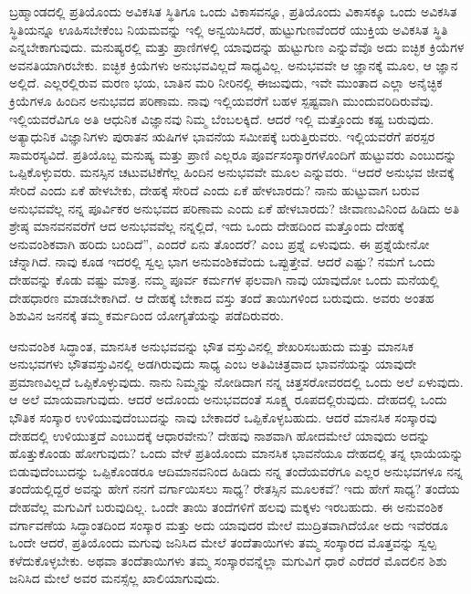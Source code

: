 ಬ್ರಹ್ಮಾಂಡದಲ್ಲಿ ಪ್ರತಿಯೊಂದು ಅವಿಕಸಿತ ಸ್ಥಿತಿಗೂ ಒಂದು ವಿಕಾಸವನ್ನೂ, ಪ್ರತಿಯೊಂದು ವಿಕಾಸಕ್ಕೂ ಒಂದು ಅವಿಕಸಿತ ಸ್ಥಿತಿಯನ್ನೂ ಊಹಿಸಬೇಕೆಂಬ ನಿಯಮವನ್ನು ಇಲ್ಲಿ ಅನ್ವಯಿಸಿದರೆ, ಹುಟ್ಟುಗುಣವೆಂದರೆ ಯುಕ್ತಿಯ ಅವಿಕಸಿತ ಸ್ಥಿತಿ ಎನ್ನಬೇಕಾಗುವುದು. ಮನುಷ್ಯರಲ್ಲಿ ಮತ್ತು ಪ್ರಾಣಿಗಳಲ್ಲಿ ಯಾವುದನ್ನು ಹುಟ್ಟುಗುಣ ಎನ್ನುವೆವೊ ಅದು ಐಚ್ಛಿಕ ಕ್ರಿಯೆಗಳ ಅವನತಿಯಾಗಿರಬೇಕು. ಐಚ್ಛಿಕ ಕ್ರಿಯೆಗಳು ಅನುಭವವಿಲ್ಲದೆ ಸಾಧ್ಯವಿಲ್ಲ. ಅನುಭವವೇ ಆ ಜ್ಞಾನಕ್ಕೆ ಮೂಲ, ಆ ಜ್ಞಾನ ಅಲ್ಲಿದೆ. ಎಲ್ಲರಲ್ಲಿರುವ ಮರಣ ಭಯ, ಬಾತಿನ ಮರಿ ನೀರಿನಲ್ಲಿ ಈಜುವುದು, ಇವೇ ಮುಂತಾದ ಎಲ್ಲಾ ಅನೈಚ್ಛಿಕ ಕ್ರಿಯೆಗಳೂ ಹಿಂದಿನ ಅನುಭವದ ಪರಿಣಾಮ. ನಾವು ಇಲ್ಲಿಯವರೆಗೆ ಬಹಳ ಸ್ಪಷ್ಟವಾಗಿ ಮುಂದುವರಿದಿರುವೆವು. ಇಲ್ಲಿಯವರೆವಿಗೂ ಅತಿ ಆಧುನಿಕ ವಿಜ್ಞಾನವು ನಿಮ್ಮ ಬೆಂಬಲಕ್ಕಿದೆ. ಆದರೆ ಇಲ್ಲಿ ಮತ್ತೊಂದು ಕಷ್ಟ ಬರುವುದು. ಅತ್ಯಾಧುನಿಕ ವಿಜ್ಞಾನಿಗಳು ಪುರಾತನ ಋಷಿಗಳ ಭಾವನೆಯ ಸಮೀಪಕ್ಕೆ ಬರುತ್ತಿರುವರು. ಇಲ್ಲಿಯವರೆಗೆ ಪರಸ್ಪರ ಸಾಮರಸ್ಯವಿದೆ. ಪ್ರತಿಯೊಬ್ಬ ಮನುಷ್ಯ ಮತ್ತು ಪ್ರಾಣಿ ಎಲ್ಲರೂ ಪೂರ್ವಸಂಸ್ಕಾರಗಳೊಂದಿಗೆ ಹುಟ್ಟುವರು ಎಂಬುದನ್ನು ಒಪ್ಪಿಕೊಳ್ಳುವರು. ಮನಸ್ಸಿನ ಚಟುವಟಿಕೆಗೆಲ್ಲ ಹಿಂದಿನ ಅನುಭವವೇ ಮೂಲ ಎನ್ನುವರು. “ಆದರೆ ಅನುಭವ ಜೀವಕ್ಕೆ ಸೇರಿದೆ ಎಂದು ಏಕೆ ಹೇಳಬೇಕು, ದೇಹಕ್ಕೆ ಸೇರಿದೆ ಎಂದು ಏಕೆ ಹೇಳಬಾರದು? ನಾನು ಹುಟ್ಟುವಾಗ ಬರುವ ಅನುಭವವೆಲ್ಲ ನನ್ನ ಪೂರ್ವಿಕರ ಅನುಭವದ ಪರಿಣಾಮ ಎಂದು ಏಕೆ ಹೇಳಬಾರದು? ಜೀವಾಣುವಿನಿಂದ ಹಿಡಿದು ಅತಿ ಶ್ರೇಷ್ಠ ಮಾನವನವರೆಗೆ ಆದ ಅನುಭವವೆಲ್ಲ ನನ್ನಲ್ಲಿದೆ, ಇದು ಒಂದು ದೇಹದಿಂದ ಮತ್ತೊಂದು ದೇಹಕ್ಕೆ ಅನುವಂಶಿಕವಾಗಿ ಹರಿದು ಬಂದಿದೆ”, ಎಂದರೆ ಏನು ತೊಂದರೆ? ಎಂಬ ಪ್ರಶ್ನೆ ಏಳುವುದು. ಈ ಪ್ರಶ್ನೆಯೇನೋ ಚೆನ್ನಾಗಿದೆ. ನಾವು ಕೂಡ ಇದರಲ್ಲಿ ಸ್ವಲ್ಪ ಭಾಗ ಅನುವಂಶಿಕವೆಂದು ಒಪ್ಪುತ್ತೇವೆ. ಆದರೆ ಎಷ್ಟು? ನಮಗೆ ಒಂದು ದೇಹವನ್ನು ಕೊಡು ವಷ್ಟು ಮಾತ್ರ. ನಮ್ಮ ಪೂರ್ವ ಕರ್ಮಗಳ ಫಲವಾಗಿ ನಾವು ಯಾವುದೋ ಒಂದು ಮನೆಯಲ್ಲಿ ದೇಹಧಾರಣ ಮಾಡಬೇಕಾಗಿದೆ. ಆ ದೇಹಕ್ಕೆ ಬೇಕಾದ ವಸ್ತು ತಂದೆ ತಾಯಿಗಳಿಂದ ಬರುವುದು. ಅವರು ಅಂತಹ ಶಿಶುವಿನ ಜನನಕ್ಕೆ ತಮ್ಮ ಕರ್ಮದಿಂದ ಯೋಗ್ಯತೆಯನ್ನು ಪಡೆದಿರುವರು.

ಆನುವಂಶಿಕ ಸಿದ್ಧಾಂತ, ಮಾನಸಿಕ ಅನುಭವವನ್ನು ಭೌತ ವಸ್ತುವಿನಲ್ಲಿ ಶೇಖರಿಸಬಹುದು ಮತ್ತು ಮಾನಸಿಕ ಅನುಭವಗಳು ಭೌತವಸ್ತುವಿನಲ್ಲಿ ಅಡಗಿರುವುದು ಸಾಧ್ಯ ಎಂಬ ಅತಿವಿಚಿತ್ರವಾದ ಭಾವನೆಯನ್ನು ಯಾವುದೇ ಪ್ರಮಾಣವಿಲ್ಲದೆ ಒಪ್ಪಿಕೊಳ್ಳುವುದು. ನಾನು ನಿಮ್ಮನ್ನು ನೋಡಿದಾಗ ನನ್ನ ಚಿತ್ತಸರೋವರದಲ್ಲಿ ಒಂದು ಅಲೆ ಏಳುವುದು. ಆ ಅಲೆ ಮಾಯವಾಗುವುದು. ಆದರೆ ಅದೊಂದು ಅನುಭವದಂತೆ ಸೂಕ್ಷ್ಮ ರೂಪದಲ್ಲಿರುವುದು. ದೇಹದಲ್ಲಿ ಒಂದು ಭೌತಿಕ ಸಂಸ್ಕಾರ ಉಳಿಯುವುದೆಂಬುದನ್ನು ನಾವು ಬೇಕಾದರೆ ಒಪ್ಪಿಕೊಳ್ಳಬಹುದು. ಆದರೆ ಮಾನಸಿಕ ಸಂಸ್ಕಾರವು ದೇಹದಲ್ಲಿ ಉಳಿಯುತ್ತದೆ ಎಂಬುದಕ್ಕೆ ಆಧಾರವೇನು? ದೇಹವು ನಾಶವಾಗಿ ಹೋದಮೇಲೆ ಯಾವುದು ಅದನ್ನು ಹೊತ್ತುಕೊಂಡು ಹೋಗುವುದು? ಒಂದು ವೇಳೆ ಪ್ರತಿಯೊಂದು ಮಾನಸಿಕ ಭಾವನೆಯೂ ದೇಹದಲ್ಲಿ ತನ್ನ ಛಾಯೆಯನ್ನು ಬಿಡುವುದೆಂಬುದನ್ನು ಒಪ್ಪಿಕೊಂಡರೂ ಆದಿಮಾನವನಿಂದ ಹಿಡಿದು ನನ್ನ ತಂದೆಯವರೆಗೂ ಎಲ್ಲರ ಅನುಭವಗಳೂ ನನ್ನ ತಂದೆಯಲ್ಲಿದ್ದರೆ ಅವನ್ನು ಹೇಗೆ ನನಗೆ ವರ್ಗಾಯಿಸಲು ಸಾಧ್ಯ? ರೇತಸ್ಸಿನ ಮೂಲಕವೆ? ಇದು ಹೇಗೆ ಸಾಧ್ಯ? ತಂದೆಯ ದೇಹವೆಲ್ಲ ಮಗುವಿಗೆ ಬರುವುದಿಲ್ಲ. ಒಂದೇ ತಾಯಿ ತಂದೆಗಳಿಗೆ ಹಲವು ಮಕ್ಕಳು ಇರಬಹುದು. ಈ ಅನುವಂಶಿಕ ವರ್ಗಾವಣೆಯ ಸಿದ್ಧಾಂತದಿಂದ ಸಂಸ್ಕಾರ ಮತ್ತು ಅದು ಯಾವುದರ ಮೇಲೆ ಮುದ್ರಿತವಾಗಿದೆಯೋ ಅದು ಇವೆರಡೂ ಒಂದೇ ಆದರೆ, ಪ್ರತಿಯೊಂದು ಮಗುವು ಜನಿಸಿದ ಮೇಲೆ ತಂದೆತಾಯಿಗಳು ತಮ್ಮ ಸಂಸ್ಕಾರದ ಮೊತ್ತವನ್ನು ಸ್ವಲ್ಪ ಕಳೆದುಕೊಳ್ಳಬೇಕು. ಅಥವಾ ತಂದೆತಾಯಿಗಳು ತಮ್ಮ ಸಂಸ್ಕಾರವನ್ನೆಲ್ಲಾ ಮಗುವಿಗೆ ಧಾರೆ ಎರೆದರೆ ಮೊದಲಿನ ಶಿಶು ಜನಿಸಿದ ಮೇಲೆ ಅವರ ಮನಸ್ಸೆಲ್ಲ ಖಾಲಿಯಾಗುವುದು.

